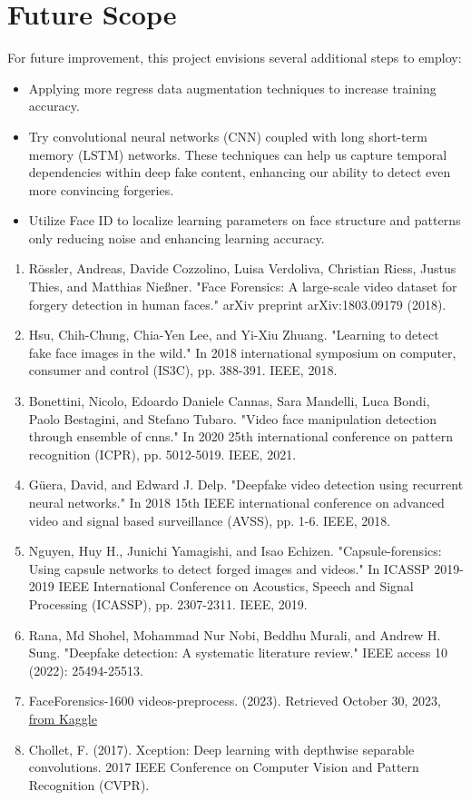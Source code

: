 \documentclass{article}
\begin{document}
\section{Future Scope}
For future improvement, this project envisions several additional steps to employ:
\begin{itemize}
    
    \item Applying more regress data augmentation techniques to increase training accuracy.
    \item Try convolutional neural networks (CNN) coupled with long short-term memory (LSTM) networks. These techniques can help us capture temporal dependencies within deep fake content, enhancing our ability to detect even more convincing forgeries.
    \item Utilize Face ID to localize learning parameters on face structure and patterns only reducing noise and enhancing learning accuracy.
\end{itemize}
\newpage


\begin{enumerate}
    \item Rössler, Andreas, Davide Cozzolino, Luisa Verdoliva, Christian Riess, Justus Thies, and Matthias Nießner. "Face Forensics: A large-scale video dataset for forgery detection in human faces." arXiv preprint arXiv:1803.09179 (2018).
    \item Hsu, Chih-Chung, Chia-Yen Lee, and Yi-Xiu Zhuang. "Learning to detect fake face images in the wild." In 2018 international symposium on computer, consumer and control (IS3C), pp. 388-391. IEEE, 2018.
    \item Bonettini, Nicolo, Edoardo Daniele Cannas, Sara Mandelli, Luca Bondi, Paolo Bestagini, and Stefano Tubaro. "Video face manipulation detection through ensemble of cnns." In 2020 25th international conference on pattern recognition (ICPR), pp. 5012-5019. IEEE, 2021.
    \item Güera, David, and Edward J. Delp. "Deepfake video detection using recurrent neural networks." In 2018 15th IEEE international conference on advanced video and signal based surveillance (AVSS), pp. 1-6. IEEE, 2018.
    \item Nguyen, Huy H., Junichi Yamagishi, and Isao Echizen. "Capsule-forensics: Using capsule networks to detect forged images and videos." In ICASSP 2019-2019 IEEE International Conference on Acoustics, Speech and Signal Processing (ICASSP), pp. 2307-2311. IEEE, 2019.
    \item Rana, Md Shohel, Mohammad Nur Nobi, Beddhu Murali, and Andrew H. Sung. "Deepfake detection: A systematic literature review." IEEE access 10 (2022): 25494-25513.
    \item FaceForensics-1600 videos-preprocess. (2023). Retrieved October 30, 2023, \href{https://www.kaggle.com/datasets/farhansharukhhasan/faceforensics1600-videospreprocess/data?select=data.}{from Kaggle}
    \item Chollet, F. (2017). Xception: Deep learning with depthwise separable convolutions. 2017 IEEE Conference on Computer Vision and Pattern Recognition (CVPR).
\end{enumerate}
\end{document}
